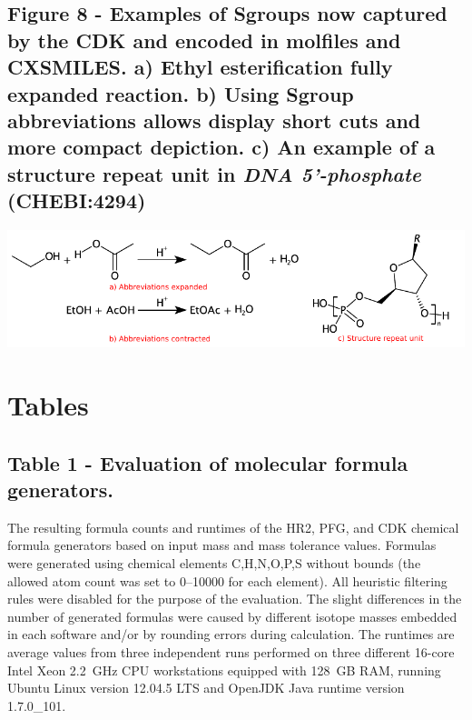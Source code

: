 \documentclass[10pt]{bmcart}
\begin{document}
\begin{backmatter}
\subsection*{Figure 8 - Examples of Sgroups now captured by the CDK and encoded in molfiles and CXSMILES. a) Ethyl esterification fully expanded reaction. b) Using Sgroup abbreviations allows display short cuts and more compact depiction. c) An example of a structure repeat unit in \textit{DNA 5'-phosphate} (\textbf{CHEBI:4294})}
\label{fig:sgroups}
      

\includegraphics[width=\textwidth]{img/sgroups.pdf}


\newpage


\newpage

\section*{Tables}


  \subsection*{Table 1 - Evaluation of molecular formula generators.}
  \label{tab:formula_generators}
  The resulting formula counts and runtimes of the HR2, PFG, and CDK chemical
formula generators based on input mass and mass tolerance values. Formulas were
generated using chemical elements C,H,N,O,P,S without bounds (the allowed atom
count was set to 0--10000 for each element). All heuristic filtering rules were
disabled for the purpose of the evaluation. The slight differences in the
number of generated formulas were caused by different isotope masses embedded
in each software and/or by rounding errors during calculation. The runtimes are
average values from three independent runs performed on three different 16-core
Intel Xeon 2.2~GHz CPU workstations equipped with 128~GB RAM, running Ubuntu
Linux version 12.04.5 LTS and OpenJDK Java runtime version 1.7.0\_101.
  \baselineskip


\end{backmatter}
\end{document}
